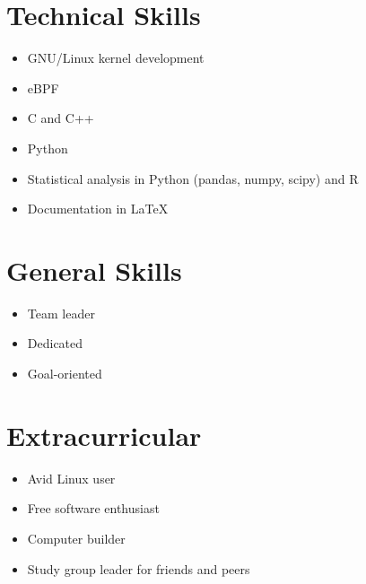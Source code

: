 \documentclass[]{article}
\theoremstyle{plain}
\theoremstyle{remark}
\theoremstyle{definition}
\begin{document}
\begin{figure}
\begin{minipage}[t]{0.32\textwidth}
\section{Technical Skills}
\begin{itemize}[itemsep=0em]
\item GNU/Linux kernel development
\item eBPF
\item C and C++
\item Python
\item Statistical analysis in Python (pandas, numpy, scipy) and R
\item Documentation in \LaTeX{}
\end{itemize}

\section{General Skills}
\begin{itemize}[itemsep=0em]
\item Team leader
\item Dedicated
\item Goal-oriented
\end{itemize}

\section{Extracurricular}
\begin{itemize}[itemsep=0em]
\item Avid Linux user
\item Free software enthusiast
\item Computer builder
\item Study group leader for friends and peers
\end{itemize}

\end{minipage}
\end{figure}

\printbibliography
\end{document}
